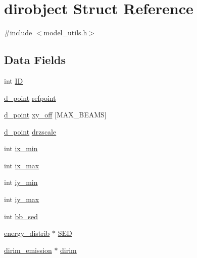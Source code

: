 \hypertarget{structdirobject}{
\section{dirobject Struct Reference}
\label{structdirobject}
}


{\ttfamily \#include $<$model\_\-utils.h$>$}\subsection*{Data Fields}
\begin{DoxyCompactItemize}
\item 
int \hyperlink{structdirobject_ac7f75c9d3cdd6d50adc84ec001beee5b}{ID}
\item 
\hyperlink{structd__point}{d\_\-point} \hyperlink{structdirobject_a66ec2727d2a5269c84804a89626834fa}{refpoint}
\item 
\hyperlink{structd__point}{d\_\-point} \hyperlink{structdirobject_a804b505c34bbecd0eb09832e34cbd5ce}{xy\_\-off} \mbox{[}MAX\_\-BEAMS\mbox{]}
\item 
\hyperlink{structd__point}{d\_\-point} \hyperlink{structdirobject_a1e61e87181abdea5dab21eb1dc3564dc}{drzscale}
\item 
int \hyperlink{structdirobject_ac068f35c585eec4cd1e5d3392c2dd698}{ix\_\-min}
\item 
int \hyperlink{structdirobject_ac8c6104f2c2e1384c64bba61ecf40d69}{ix\_\-max}
\item 
int \hyperlink{structdirobject_af24c9a92fa18516591e43d96eec13272}{iy\_\-min}
\item 
int \hyperlink{structdirobject_a3b36973dd52d158c059bfe6587a04244}{iy\_\-max}
\item 
int \hyperlink{structdirobject_a8fe8b9502f2baafd4ea433cb8f6acaa9}{bb\_\-sed}
\item 
\hyperlink{structenergy__distrib}{energy\_\-distrib} $\ast$ \hyperlink{structdirobject_a79645e83aebf3988bd3464b2079d24c1}{SED}
\item 
\hyperlink{structdirim__emission}{dirim\_\-emission} $\ast$ \hyperlink{structdirobject_a484dadbe6f9bdade97aa303366b4ef6a}{dirim}
\end{DoxyCompactItemize}


